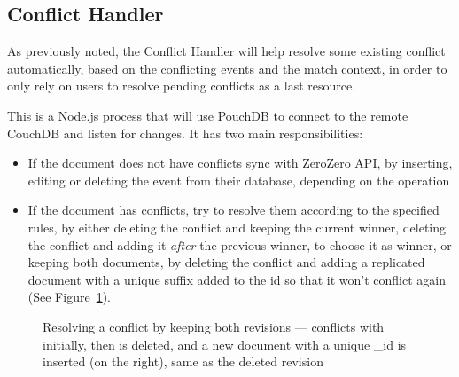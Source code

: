 \subsection{Conflict Handler}

As previously noted, the Conflict Handler will help resolve some existing conflict automatically, based on the conflicting events and the match context, in order to only rely on users to resolve pending conflicts as a last resource.

This is a Node.js process that will use PouchDB to connect to the remote CouchDB and listen for changes. It has two main responsibilities:
\begin{itemize}
    \item If the document does not have conflicts sync with ZeroZero API, by inserting, editing or deleting the event from their database, depending on the operation
    \item If the document has conflicts, try to resolve them according to the specified rules, by either deleting the conflict and keeping the current winner, deleting the conflict and adding it \textit{after} the previous winner, to choose it as winner, or keeping both documents, by deleting the conflict and adding a replicated document with a unique suffix added to the id so that it won't conflict again (See Figure~\ref{graph:keep-both-resolution}).
\end{itemize}

\begin{figure}[h]
    \centering
  \caption[Resolving a conflict by keeping both revisions]{Resolving a conflict by keeping both revisions ---  conflicts with  initially, then  is deleted, and a new document with a unique \_id is inserted (on the right), same as the deleted revision }
  \label{graph:keep-both-resolution}
  \end{figure}

